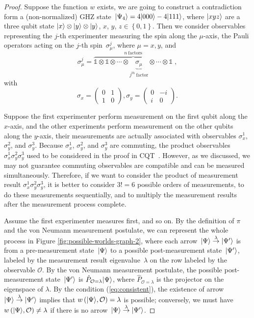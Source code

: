 \documentclass[english,12pt]{iopart}
\newcommand{\dpr}{{\pi}}
\begin{document}
\begin{proof}Suppose the function $w$ exists, we are going to construct
a contradiction form a (non-normalized) GHZ state~${\left\vert{\Psi_{4}}\right\rangle}=4{\left\vert{000}\right\rangle}-4{\left\vert{111}\right\rangle}$,
where ${\left\vert{xyz}\right\rangle}$ are a three qubit state ${\left\vert{x}\right\rangle}\otimes{\left\vert{y}\right\rangle}\otimes{\left\vert{y}\right\rangle}$,
$x$, $y$, $z\in\left\{ 0,1\right\} $. Then we consider observables
representing the $j$-th experimenter measuring the spin along the
$\mu$-axis, the Pauli operators acting on the $j$-th spin~$\sigma_{\mu}^{j}$,
where $\mu=x,y$, and 
\begin{equation}
\sigma_{\mu}^{j}=\overbrace{\mathds{1}\otimes\mathds{1}\otimes\cdots\otimes\underbrace{\sigma_{\mu}}_{j^{th}\ \mbox{factor}}\otimes\cdots\otimes\mathds{1}}^{n\ \mbox{factors}}\;,\label{pauli3}
\end{equation}
with 
\[
\sigma_{x}=\left(\begin{array}{cc}
0 & 1\\
1 & 0
\end{array}\right),\sigma_{y}=\left(\begin{array}{cc}
0 & -i\\
i & 0
\end{array}\right).
\]

Suppose the first experimenter perform measurement on the first qubit
along the $x$-axis, and the other experiments perform measurement on
the other qubits along the $y$-axis, their measurements are actually
associated with observables $\sigma_{x}^{1}$, $\sigma_{y}^{2}$, and
$\sigma_{y}^{3}$. Because $\sigma_{x}^{1}$, $\sigma_{y}^{2}$, and
$\sigma_{y}^{3}$ are commuting, the product
observables~$\sigma_{x}^{1}\sigma_{y}^{2}\sigma_{y}^{3}$ used to be
considered in the proof in CQT~\cite{MerminPRL1990,peres1995quantum}.
However, as we discussed, we may not guarantee commuting observables
are compatible and can be measured simultaneously. Therefore, if we
want to consider the product of measurement result
$\sigma_{x}^{1}\sigma_{y}^{2}\sigma_{y}^{3}$, it is better to consider
$3!=6$ possible orders of measurements, to do these measurements
sequentially, and to multiply the measurement results after the
measurement process complete.

Assume the first experimenter measures first, and so on. By the
definition of $\dpr $ and the von Neumann measurement postulate, we
can represent the whole process in Figure
\ref{fig:possible-worlds-graph-2}, where each
arrow~$\ket{\Psi}\overset{\lambda}{\rightarrow}\ket{\Psi'}$ is from a
pre-measurement state~${\left\vert{\Psi}\right\rangle}$ to a possible post-measurement
state~${\left\vert{\Psi'}\right\rangle}$, labeled by the measurement result
eigenvalue~$\lambda$ on the row labeled by the observable
$\mathcal{O}$. By the von Neumann measurement postulate, the possible
post-measurement state~${\left\vert{\Psi'}\right\rangle}$ is
$\hat{P}_{\mathcal{O}=\lambda}{\left\vert{\Psi}\right\rangle}$, where
$\hat{P}_{\mathcal{O}=\lambda}$ is the projector on the eigenspace of
$\lambda$. By the condition (\ref{eq:consistent}), the existence of
arrow~$\ket{\Psi}\overset{\lambda}{\rightarrow}\ket{\Psi'}$ implies
that $w\left({\left\vert{\Psi}\right\rangle},\mathcal{O}\right)=\lambda$ is possible;
conversely, we must have
$w\left({\left\vert{\Psi}\right\rangle},\mathcal{O}\right)\ne\lambda$ if there is no
arrow~$\ket{\Psi}\overset{\lambda}{\rightarrow}\ket{\Psi'}$.


\end{proof}
\end{document}
